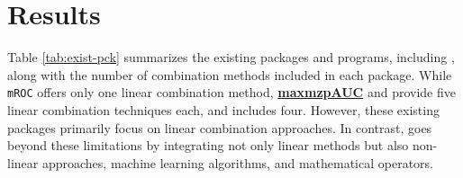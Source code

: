 \section{Results}\label{results}

Table \ref{tab:exist-pck} summarizes the existing packages and programs, including , along with the number of combination methods included in each package. While \texttt{mROC} offers only one linear combination method, \href{https://github.com/wbaopaul/MaxmzpAUC-R}{\textbf{maxmzpAUC}} and  provide five linear combination techniques each, and  includes four. However, these existing packages primarily focus on linear combination approaches. In contrast,  goes beyond these limitations by integrating not only linear methods but also non-linear approaches, machine learning algorithms, and mathematical operators.

